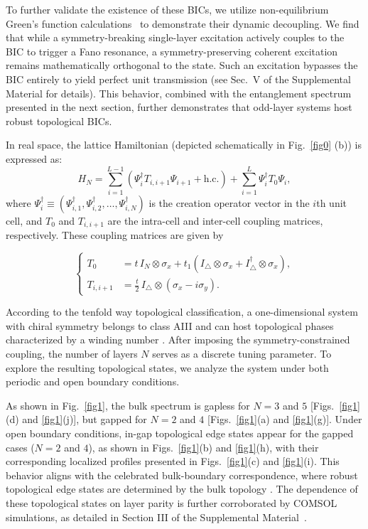 \documentclass[twocolumn,english,prl,epsfig,rotate,showpacs,aps, superscriptaddress]{revtex4-2}
\begin{document}
{{To further validate the existence of these BICs, we utilize non-equilibrium Green's function calculations~\cite{datta1997electronic} to demonstrate their dynamic decoupling. We find that while a symmetry-breaking single-layer excitation actively couples to the BIC to trigger a Fano resonance, a symmetry-preserving coherent excitation remains mathematically orthogonal to the state. Such an excitation bypasses the BIC entirely to yield perfect unit transmission (see Sec.~V of the Supplemental Material for details). This behavior, combined with the entanglement spectrum presented in the next section, further demonstrates that odd-layer systems host robust topological BICs.}}

In real space, the lattice Hamiltonian (depicted schematically in Fig.~\ref{fig0} (b)) is expressed as:
\begin{equation}
H_N = \sum_{i=1}^{L-1} \left(\Psi_{i}^\dagger T_{i,i+1} \Psi_{i+1} + \text{h.c.}\right) + \sum_{i=1}^{L} \Psi_{i}^\dagger T_{0} \Psi_{i},
\label{eq:HNR}
\end{equation}
where $\Psi_{i}^\dagger \equiv \left(\Psi_{i,1}^\dagger, \Psi_{i,2}^\dagger, \dots, \Psi_{i,N}^\dagger\right)$ is the creation operator vector in the $i$th unit cell, and $T_0$ and $T_{i,i+1}$ are the intra-cell and inter-cell coupling matrices, respectively. These coupling matrices are given by

\begin{equation}
\left\{
\begin{aligned}
T_0 &= t \, I_N \otimes \sigma_x + t_1 \left(I_{\triangle} \otimes \sigma_x + I_{\triangle}^\dagger \otimes \sigma_x\right), \\
T_{i,i+1} &= \frac{t}{2} \, I_{\triangle} \otimes (\sigma_x - i\sigma_y).
\end{aligned}
\right.
\label{eq:coupling}
\end{equation}

According to the tenfold way topological classification, a one-dimensional system with chiral symmetry belongs to class AIII and can host topological phases characterized by a winding number \cite{ryu2010topological}. After imposing the symmetry-constrained coupling, the number of layers \(N\) serves as a discrete tuning parameter. To explore the resulting topological states, we analyze the system under both periodic and open boundary conditions.

As shown in Fig.~\ref{fig1}, the bulk spectrum is gapless for $N=3$ and $5$ [Figs.~\ref{fig1}(d) and \ref{fig1}(j)], but gapped for $N=2$ and $4$ [Figs.~\ref{fig1}(a) and \ref{fig1}(g)]. Under open boundary conditions, in-gap topological edge states appear for the gapped cases ($N=2$ and $4$), as shown in Figs.~\ref{fig1}(b) and \ref{fig1}(h), with their corresponding localized profiles presented in Figs.~\ref{fig1}(c) and \ref{fig1}(i). This behavior aligns with the celebrated bulk-boundary correspondence, where robust topological edge states are determined by the bulk topology \cite{hasan2010colloquium,qi2011topological}. The dependence of these topological states on layer parity is further corroborated by COMSOL simulations, as detailed in Section III of the Supplemental Material~\cite{SM}.
\end{document}
